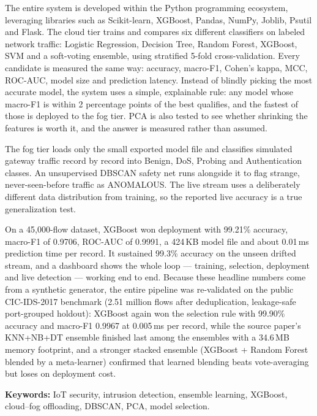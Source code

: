 \documentclass[12pt,a4paper]{article}
\begin{document}
The entire system is developed within the Python programming ecosystem, leveraging
libraries such as Scikit-learn, XGBoost, Pandas, NumPy, Joblib, Psutil and Flask. The
cloud tier trains and compares six different classifiers on labeled network traffic:
Logistic Regression, Decision Tree, Random Forest, XGBoost, SVM and a soft-voting
ensemble, using stratified 5-fold cross-validation. Every candidate is measured the
same way: accuracy, macro-F1, Cohen's kappa, MCC, ROC-AUC, model size and prediction
latency. Instead of blindly picking the most accurate model, the system uses a simple,
explainable rule: any model whose macro-F1 is within 2 percentage points of the best
qualifies, and the fastest of those is deployed to the fog tier. PCA is also tested to
see whether shrinking the features is worth it, and the answer is measured rather than
assumed.

The fog tier loads only the small exported model file and classifies simulated gateway
traffic record by record into Benign, DoS, Probing and Authentication classes. An
unsupervised DBSCAN safety net runs alongside it to flag strange, never-seen-before
traffic as ANOMALOUS. The live stream uses a deliberately different data distribution
from training, so the reported live accuracy is a true generalization test.

On a 45,000-flow dataset, XGBoost won deployment with 99.21\% accuracy, macro-F1 of
0.9706, ROC-AUC of 0.9991, a 424\,KB model file and about 0.01\,ms prediction time per
record. It sustained 99.3\% accuracy on the unseen drifted stream, and a dashboard
shows the whole loop --- training, selection, deployment and live detection --- working
end to end. Because these headline numbers come from a synthetic generator, the entire
pipeline was re-validated on the public CIC-IDS-2017 benchmark (2.51 million flows
after deduplication, leakage-safe port-grouped holdout): XGBoost again won the
selection rule with 99.90\% accuracy and macro-F1 0.9967 at 0.005\,ms per record,
while the source paper's KNN+NB+DT ensemble finished last among the ensembles with a
34.6\,MB memory footprint, and a stronger stacked ensemble (XGBoost + Random Forest
blended by a meta-learner) confirmed that learned blending beats vote-averaging but
loses on deployment cost.

\vspace{0.5cm}
\noindent\textbf{Keywords:} IoT security, intrusion detection, ensemble learning,
XGBoost, cloud--fog offloading, DBSCAN, PCA, model selection.

\clearpage
\end{document}
